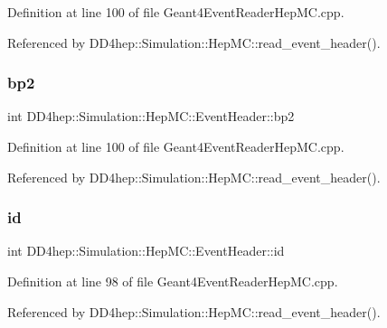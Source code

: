 Definition at line 100 of file Geant4\+Event\+Reader\+Hep\+M\+C.\+cpp.



Referenced by D\+D4hep\+::\+Simulation\+::\+Hep\+M\+C\+::read\+\_\+event\+\_\+header().

\hypertarget{class_d_d4hep_1_1_simulation_1_1_hep_m_c_1_1_event_header_a4b3d20b78f49d539c6487d2a5eeb844c}{}\label{class_d_d4hep_1_1_simulation_1_1_hep_m_c_1_1_event_header_a4b3d20b78f49d539c6487d2a5eeb844c} 
\subsubsection{\texorpdfstring{bp2}{bp2}}
{\footnotesize\ttfamily int D\+D4hep\+::\+Simulation\+::\+Hep\+M\+C\+::\+Event\+Header\+::bp2}



Definition at line 100 of file Geant4\+Event\+Reader\+Hep\+M\+C.\+cpp.



Referenced by D\+D4hep\+::\+Simulation\+::\+Hep\+M\+C\+::read\+\_\+event\+\_\+header().

\hypertarget{class_d_d4hep_1_1_simulation_1_1_hep_m_c_1_1_event_header_a221f01143ced151a262de45ca6749cc4}{}\label{class_d_d4hep_1_1_simulation_1_1_hep_m_c_1_1_event_header_a221f01143ced151a262de45ca6749cc4} 
\subsubsection{\texorpdfstring{id}{id}}
{\footnotesize\ttfamily int D\+D4hep\+::\+Simulation\+::\+Hep\+M\+C\+::\+Event\+Header\+::id}



Definition at line 98 of file Geant4\+Event\+Reader\+Hep\+M\+C.\+cpp.



Referenced by D\+D4hep\+::\+Simulation\+::\+Hep\+M\+C\+::read\+\_\+event\+\_\+header().

\hypertarget{class_d_d4hep_1_1_simulation_1_1_hep_m_c_1_1_event_header_a83354fc882a2fb46a053a524a7145eb1}{}\label{class_d_d4hep_1_1_simulation_1_1_hep_m_c_1_1_event_header_a83354fc882a2fb46a053a524a7145eb1} 
